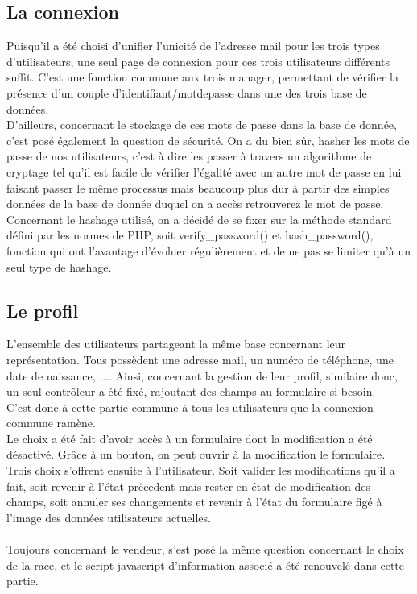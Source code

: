 \documentclass{article}
\begin{document}
\subsection{La connexion}
Puisqu'il a été choisi d'unifier l'unicité de l'adresse mail pour les trois types d'utilisateurs, une seul page de connexion pour ces trois utilisateurs différents suffit. 
C'est une fonction commune aux trois manager, permettant de vérifier la présence d'un couple d'identifiant/motdepasse dans une des trois base de données. 
\\
D'ailleurs, concernant le stockage de ces mots de passe dans la base de donnée, c'est posé également la question de sécurité. On a du bien sûr, hasher les mots de passe de nos utilisateurs, c'est à dire les passer à travers un algorithme de cryptage tel qu'il est facile de vérifier l'égalité avec un autre mot de passe en lui faisant passer le même processus mais beaucoup plus dur à partir des simples données de la base de donnée duquel on a accès retrouverez le mot de passe. 
\\ Concernant le hashage utilisé, on a décidé de se fixer sur la méthode standard défini par les normes de PHP, soit verify_password() et hash_password(), fonction qui ont l'avantage d'évoluer régulièrement et de ne pas se limiter qu'à un seul type de hashage. 
\\
\subsection{Le profil} 
L'ensemble des utilisateurs partageant la même base concernant leur représentation. Tous possèdent une adresse mail, un numéro de téléphone, une date de naissance, .... Ainsi, concernant la gestion de leur profil, similaire donc, un seul contrôleur a été fixé, rajoutant des champs au formulaire si besoin. 
\\  C'est donc à cette partie commune à tous les utilisateurs que la connexion commune ramène. 
\\
Le choix a été fait d'avoir accès à un formulaire dont la modification a été désactivé. Grâce à un bouton, on peut ouvrir à la modification le formulaire. \\
Trois choix s'offrent ensuite à l'utilisateur. Soit valider les modifications qu'il a fait, soit revenir à l'état précedent mais rester en état de modification des champs, soit annuler ses changements et revenir à l'état du formulaire figé à l'image des données utilisateurs actuelles. \\ \\
Toujours concernant le vendeur, s'est posé la même question concernant le choix de la race, et le script javascript d'information associé  a été renouvelé dans cette partie. 
\end{document}
